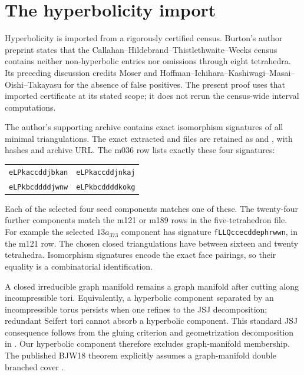 \documentclass[11pt]{article}
\begin{document}
\section{The hyperbolicity import}

Hyperbolicity is imported from a rigorously certified census.
Burton's author preprint \cite[Corollary 1.2, printed p.~2]{burton}
states that the Callahan--Hildebrand--Thistlethwaite--Weeks census
contains neither non-hyperbolic entries nor omissions through eight
tetrahedra. Its preceding discussion credits Moser and
Hoffman--Ichihara--Kashiwagi--Masai--Oishi--Takayasu for the
absence of false positives. The present proof uses that imported
certificate at its stated scope; it does not rerun the census-wide
interval computations.

The author's supporting archive contains exact isomorphism signatures
of all minimal triangulations. The exact extracted
 and  files are retained as
 and
, with hashes and archive URL.
The m036 row lists exactly these four signatures:
\begin{center}\small
\begin{tabular}{ll}
\texttt{eLPkaccddjbkan}& \texttt{eLPkaccddjnkaj}\\
\texttt{eLPkbcddddjwnw}& \texttt{eLPkbcddddkokg}
\end{tabular}
\end{center}
Each of the selected four seed components matches one of these.
The twenty-four further components match the m121 or m189 rows in
the five-tetrahedron file. For example the selected $13a_{373}$ component
has signature \texttt{fLLQccecddephrwwn}, in the m121 row.
The chosen closed triangulations have between sixteen and twenty tetrahedra.
Isomorphism signatures encode the exact face pairings, so their equality
is a combinatorial identification.

A closed irreducible graph manifold remains a graph manifold after
cutting along incompressible tori. Equivalently, a hyperbolic component
separated by an incompressible torus persists when one refines to the JSJ
decomposition; redundant Seifert tori cannot absorb a hyperbolic component.
This standard JSJ consequence follows from the gluing criterion
and geometrization decomposition in
\cite[Proposition 1.6.2 and Theorem 1.7.6]{afw}.
Our hyperbolic component therefore excludes graph-manifold membership.
The published BJW18 theorem explicitly assumes a
graph-manifold double branched cover \cite[Theorem 1.2]{bjw}.
\end{document}
